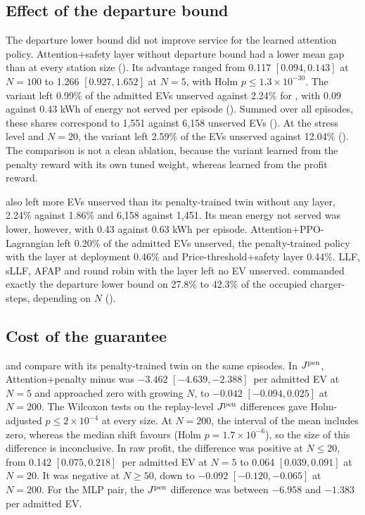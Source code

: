 \subsection{Effect of the departure bound}\label{sec:res-bound}

The departure lower bound did not improve service for the learned attention policy.
Attention+safety layer without departure bound had a lower mean gap than \method{} at every station size ().
Its advantage ranged from 0.117 $[0.094,0.143]$ at $N=100$ to 1.266 $[0.927,1.652]$ at $N=5$, with Holm $p\le1.3\times10^{-30}$.
The variant left 0.99\% of the admitted EVs unserved against 2.24\% for \method{}, with 0.09 against 0.43 kWh of energy not served per episode ().
Summed over all episodes, these shares correspond to 1,551 against 6,158 unserved EVs ().
At the stress level and $N=20$, the variant left 2.59\% of the EVs unserved against 12.04\% ().
The comparison is not a clean ablation, because the variant learned from the penalty reward with its own tuned weight, whereas \method{} learned from the profit reward.

\method{} also left more EVs unserved than its penalty-trained twin without any layer, 2.24\% against 1.86\% and 6,158 against 1,451.
Its mean energy not served was lower, however, with 0.43 against 0.63 kWh per episode.
Attention+PPO-Lagrangian left 0.20\% of the admitted EVs unserved, the penalty-trained policy with the layer at deployment 0.46\% and Price-threshold+safety layer 0.44\%.
LLF, sLLF, AFAP and round robin with the layer left no EV unserved.
\method{} commanded exactly the departure lower bound on 27.8\% to 42.3\% of the occupied charger-steps, depending on $N$ ().

\subsection{Cost of the guarantee}\label{sec:res-cost}

 and  compare \method{} with its penalty-trained twin on the same episodes.
In $J^{\mathrm{pen}}$, Attention+penalty minus \method{} was $-3.462$ $[-4.639,-2.388]$\,\texteuro{} per admitted EV at $N=5$ and approached zero with growing $N$, to $-0.042$ $[-0.094,0.025]$ at $N=200$.
The Wilcoxon tests on the replay-level $J^{\mathrm{pen}}$ differences gave Holm-adjusted $p\le2\times10^{-4}$ at every size.
At $N=200$, the interval of the mean includes zero, whereas the median shift favours \method{} (Holm $p=1.7\times10^{-6}$), so the size of this difference is inconclusive.
In raw profit, the difference was positive at $N\le20$, from 0.142 $[0.075,0.218]$\,\texteuro{} per admitted EV at $N=5$ to 0.064 $[0.039,0.091]$ at $N=20$.
It was negative at $N\ge50$, down to $-0.092$ $[-0.120,-0.065]$ at $N=200$.
For the MLP pair, the $J^{\mathrm{pen}}$ difference was between $-6.958$ and $-1.383$\,\texteuro{} per admitted EV.

